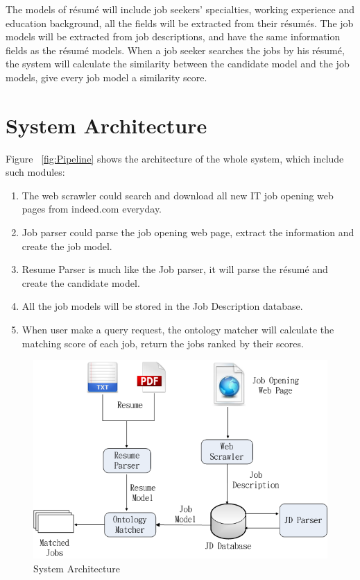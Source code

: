 The models of r\'esum\'e will include job seekers' specialties, working experience and education background, all the fields will be extracted from their r\'esum\'es. The job models will be extracted from job descriptions, and have the same information fields as the r\'esum\'e models.  When a job seeker searches the jobs by his r\'esum\'e, the system will calculate the similarity between the candidate model and the job models, give every job model a similarity score.

\section{System Architecture}

Figure ~\ref{fig:Pipeline} shows the architecture of the whole system, which include such modules:

\begin{enumerate}
    \item The web scrawler could search and download all new IT job opening web pages  from indeed.com everyday.
    \item Job parser could parse the job opening web page, extract the information and create the job model.
    \item Resume Parser is much like the Job parser, it will parse the r\'esum\'e and create the candidate model.
    \item All the job models will be stored in the Job Description database.
    \item When user make a query request, the ontology matcher will calculate the matching score of each job, return the jobs ranked by their scores.
\end{enumerate}

\begin{figure}[htbp]
  \centering
  \includegraphics[scale=0.5]{images/arch.png}
  \caption{System Architecture}
  \label{fig:arch}
\end{figure}

